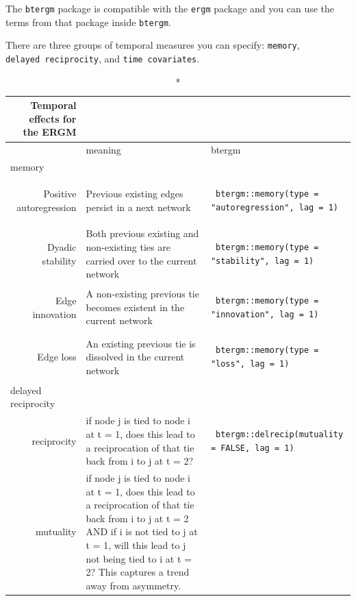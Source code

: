 \documentclass[
]{article}
\begin{document}
The \texttt{btergm} package is compatible with the \texttt{ergm} package
and you can use the terms from that package inside \texttt{btergm}.

There are three groups of temporal measures you can specify:
\texttt{memory}, \texttt{delayed\ reciprocity}, and
\texttt{time\ covariates}.

\captionsetup[table]{labelformat=empty,skip=1pt}
\begin{longtable}{r|ll}
\caption*{
{\large Temporal effects for the ERGM}
} \\ 
\toprule
\multicolumn{1}{l}{} & meaning & btergm \\ 
\midrule
\multicolumn{1}{l}{memory} \\ 
\midrule
Positive autoregression & Previous existing edges persist in a next network & \begin{verbatim}
 btergm::memory(type = "autoregression", lag = 1)
\end{verbatim} \\ 
Dyadic stability & Both previous existing and non-existing ties are carried over to the current network & \begin{verbatim}
 btergm::memory(type = "stability", lag = 1)
\end{verbatim} \\ 
Edge innovation & A non-existing previous tie becomes existent in the current network & \begin{verbatim}
 btergm::memory(type = "innovation", lag = 1)
\end{verbatim} \\ 
Edge loss & An existing previous tie is dissolved in the current network & \begin{verbatim}
 btergm::memory(type = "loss", lag = 1)
\end{verbatim} \\ 
\midrule
\multicolumn{1}{l}{delayed reciprocity} \\ 
\midrule
reciprocity & if node j is tied to node i at t = 1, does this lead to a reciprocation of that tie back from i to j at t = 2? & \begin{verbatim}
 btergm::delrecip(mutuality = FALSE, lag = 1)
\end{verbatim} \\ 
mutuality & if node j is tied to node i at t = 1, does this lead to a reciprocation of that tie back from i to j at t = 2 AND if i is not tied to j at t = 1, will this lead to j not being tied to i at t = 2? This captures a trend away from asymmetry. & \begin{verbatim}

\end{verbatim}
\end{longtable}
\end{document}
